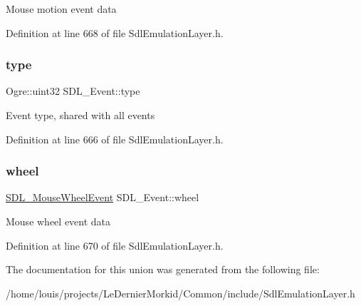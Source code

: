 Mouse motion event data 

Definition at line 668 of file Sdl\+Emulation\+Layer.\+h.

\mbox{\label{union_s_d_l___event_a8edda577bed999c1c67fec65746637fa}} 
\subsubsection{\texorpdfstring{type}{type}}
{\footnotesize\ttfamily Ogre\+::uint32 S\+D\+L\+\_\+\+Event\+::type}

Event type, shared with all events 

Definition at line 666 of file Sdl\+Emulation\+Layer.\+h.

\mbox{\label{union_s_d_l___event_a267d3f550715519ec90a81ccd0e6cbda}} 
\subsubsection{\texorpdfstring{wheel}{wheel}}
{\footnotesize\ttfamily \hyperlink{struct_s_d_l___mouse_wheel_event}{S\+D\+L\+\_\+\+Mouse\+Wheel\+Event} S\+D\+L\+\_\+\+Event\+::wheel}

Mouse wheel event data 

Definition at line 670 of file Sdl\+Emulation\+Layer.\+h.



The documentation for this union was generated from the following file\+:\begin{DoxyCompactItemize}
\item 
/home/louis/projects/\+Le\+Dernier\+Morkid/\+Common/include/Sdl\+Emulation\+Layer.\+h\end{DoxyCompactItemize}
